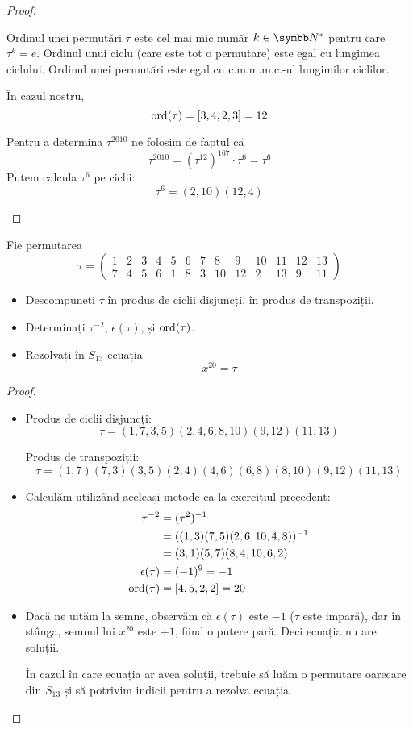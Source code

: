 \begin{proof}
\begin{itemize}
    Ordinul unei permutări \(\tau\) este cel mai mic număr \(k \in \naturals^*\) pentru care \(\tau^k = e\). Ordinul unui ciclu (care este tot o permutare) este egal cu lungimea ciclului. Ordinul unei permutări este egal cu c.m.m.m.c.-ul lungimilor ciclilor.

    În cazul nostru,
    \[
        \operatorname{ord}(\tau) = [3, 4, 2, 3] = 12
    \]

    Pentru a determina \(\tau^{2010}\) ne folosim de faptul că
    \[
        \tau^{2010} = (\tau^{12})^{167} \cdot \tau^6 = \tau^6
    \]
    Putem calcula \(\tau^{6}\) pe ciclii:
    \[
        \tau^6 = (2, 10) (12, 4)
    \]
\end{itemize}
\end{proof}

\begin{exercise}
Fie permutarea
\[
\tau = \begin{pmatrix}
1 & 2 & 3 & 4 & 5 & 6 & 7 & 8 & 9 & 10 & 11 & 12 & 13 \\
7 & 4 & 5 & 6 & 1 & 8 & 3 & 10 & 12 & 2 & 13 & 9 & 11
\end{pmatrix}
\]
\begin{itemize}
    \item Descompuneți \(\tau\) în produs de ciclii disjuncți, în produs de transpoziții.
    \item Determinați \(\tau^{-2}\), \(\epsilon(\tau)\), și \(\operatorname{ord}(\tau)\).
    \item Rezolvați în \(S_{13}\) ecuația
    \[
        x^{20} = \tau
    \]
\end{itemize}
\end{exercise}
\begin{proof}
~
\begin{itemize}
    \item
    Produs de ciclii disjuncți:
    \[
        \tau = (1, 7, 3, 5) (2, 4, 6, 8, 10) (9, 12) (11, 13)
    \]

    Produs de transpoziții:
    \[
        \tau = (1, 7) (7, 3) (3, 5) (2, 4) (4, 6) (6, 8) (8, 10) (9, 12) (11, 13)
    \]

    \item Calculăm utilizând aceleași metode ca la exercițiul precedent:
    \begin{align*}
        \tau^{-2} &= (\tau^2)^{-1} \\
        &= ((1, 3) (7, 5) (2, 6, 10, 4, 8))^{-1} \\
        &= (3, 1) (5, 7) (8, 4, 10, 6, 2) \\
        \epsilon(\tau) &= (-1)^{9} = -1 \\
        \operatorname{ord}(\tau) &= [4, 5, 2, 2] = 20
    \end{align*}

    \item Dacă ne uităm la semne, observăm că \(\epsilon(\tau)\) este \(-1\) (\(\tau\) este impară), dar în stânga, semnul lui \(x^{20}\) este \(+1\), fiind o putere pară. Deci ecuația nu are soluții.

    În cazul în care ecuația ar avea soluții, trebuie să luăm o permutare oarecare din \(S_{13}\) și să potrivim indicii pentru a rezolva ecuația.
\end{itemize}
\end{proof}
